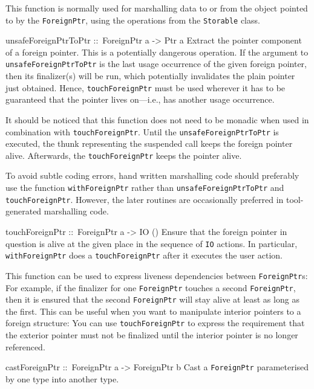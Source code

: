 \documentclass[a4paper,twoside]{article}
\makeatletter
\newcommand{\code}[1]{\texttt{#1}}      %
\newenvironment{codedesc}{%
  \list{}{\labelwidth\z@
    \let\makelabel\codedesclabel}
  }{%
  \endlist
  }
\newcommand*{\codedesclabel}[1]{%
  \hspace{-\leftmargin}
  \parbox[b]{\labelwidth}{\makebox[0pt][l]{\code{#1}}\\}\hfil\relax
  }
\makeatother
\begin{document}
\begin{codedesc}
  This function is normally used for marshalling data to or from the object
  pointed to by the \code{ForeignPtr}, using the operations from the
  \code{Storable} class.

\item[unsafeForeignPtrToPtr ::\ ForeignPtr a -> Ptr a]
  Extract the pointer component of a foreign pointer. This is a potentially
  dangerous operation.  If the argument to \code{unsafeForeignPtrToPtr} is the
  last usage occurrence of the given foreign pointer, then its finalizer(s)
  will be run, which potentially invalidates the plain pointer just obtained.
  Hence, \code{touchForeignPtr} must be used wherever it has to be guaranteed
  that the pointer lives on---i.e., has another usage occurrence.
  
  It should be noticed that this function does not need to be monadic when
  used in combination with \code{touchForeignPtr}.  Until the
  \code{unsafeForeignPtrToPtr} is executed, the thunk representing the
  suspended call keeps the foreign pointer alive.  Afterwards, the
  \code{touchForeignPtr} keeps the pointer alive.
  
  To avoid subtle coding errors, hand written marshalling code should
  preferably use the function \code{withForeignPtr} rather than
  \code{unsafeForeignPtrToPtr} and \code{touchForeignPtr}. However, the later
  routines are occasionally preferred in tool-generated marshalling code.
  
\item[touchForeignPtr ::\ ForeignPtr a -> IO ()] Ensure that the foreign
  pointer in question is alive at the given place in the sequence of \code{IO}
  actions. In particular, \code{withForeignPtr} does a \code{touchForeignPtr}
  after it executes the user action.
  
  This function can be used to express liveness dependencies between
  \code{ForeignPtr}s: For example, if the finalizer for one \code{ForeignPtr}
  touches a second \code{ForeignPtr}, then it is ensured that the second
  \code{ForeignPtr} will stay alive at least as long as the first. This can be
  useful when you want to manipulate interior pointers to a foreign structure:
  You can use \code{touchForeignPtr} to express the requirement that the
  exterior pointer must not be finalized until the interior pointer is no
  longer referenced.
    
\item[castForeignPtr ::\ ForeignPtr a -> ForeignPtr b] Cast a
  \code{ForeignPtr} parameterised by one type into another type.
\end{codedesc}
\end{document}

